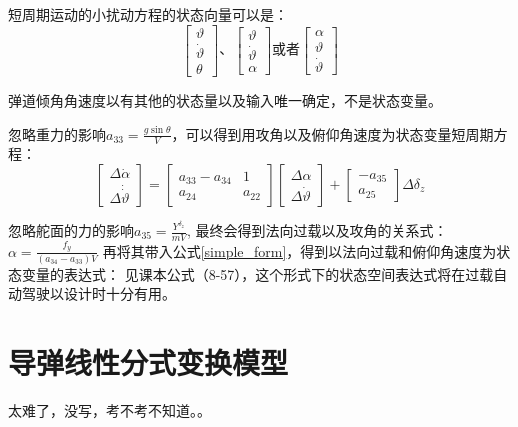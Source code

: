 短周期运动的小扰动方程的状态向量可以是：
\begin{equation*}
    \left[
    \begin{smallmatrix}
        \vartheta \\
        \dot{\vartheta} \\
        \theta
    \end{smallmatrix}    
    \right]
    \mbox{、}
    \left[
    \begin{smallmatrix}
        \vartheta \\
        \dot{\vartheta} \\
        \alpha
    \end{smallmatrix}    
    \right]
    \mbox{或者}
    \left[
        \begin{smallmatrix}
            \alpha\\
            \vartheta \\
            \dot{\vartheta}
        \end{smallmatrix}    
        \right]
\end{equation*}


弹道倾角角速度以有其他的状态量以及输入唯一确定，不是状态变量。

忽略重力的影响$a_{33}=\frac{g\sin\theta}{V}$，可以得到用攻角以及俯仰角速度为状态变量短周期方程：
\begin{equation}
    \left[
        \begin{smallmatrix}
            \Delta\dot{\alpha}\\
            \Delta\dot{\dot{\vartheta}}
        \end{smallmatrix}
    \right] = 
    \left[
    \begin{smallmatrix}
        a_{33}-a_{34} &1\\
        a_{24} &a_{22}
    \end{smallmatrix}
    \right]
    \left[
    \begin{smallmatrix}
        \Delta{\alpha}\\
        \Delta{\dot{\vartheta}}
    \end{smallmatrix}
    \right]+
    \left[
    \begin{smallmatrix}
        -a_{35}\\
        a_{25}
    \end{smallmatrix}
    \right]
    \Delta\delta_z
    \label{simple_form}
\end{equation}

忽略舵面的力的影响$a_{35}=\frac{Y^{\delta_z}}{mV}$,
最终会得到法向过载以及攻角的关系式：$\alpha =\frac{f_y}{(a_{34}-a_{33})V}$
再将其带入公式\eqref{simple_form}，得到以法向过载和俯仰角速度为状态变量的表达式：
见课本公式（8-57），这个形式下的状态空间表达式将在过载自动驾驶以设计时十分有用。
\section{导弹线性分式变换模型}
太难了，没写，考不考不知道。。